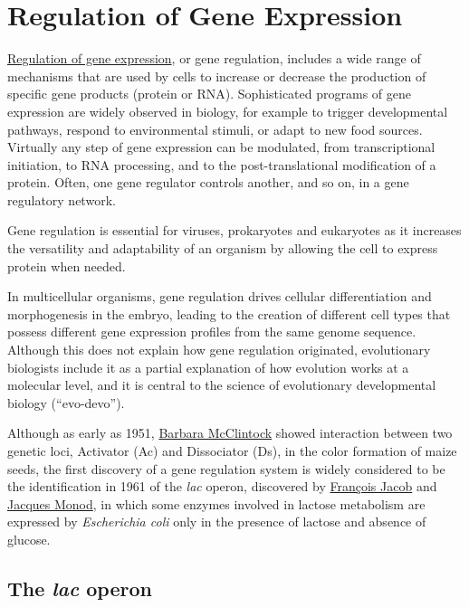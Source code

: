 \hypertarget{regulation-of-gene-expression}{%
\chapter{Regulation of Gene Expression}\label{regulation-of-gene-expression}}

\href{https://en.wikipedia.org/wiki/Regulation_of_gene_expression}{Regulation of gene expression}, or gene regulation, includes a wide range of mechanisms that are used by cells to increase or decrease the production of specific gene products (protein or RNA). Sophisticated programs of gene expression are widely observed in biology, for example to trigger developmental pathways, respond to environmental stimuli, or adapt to new food sources. Virtually any step of gene expression can be modulated, from transcriptional initiation, to RNA processing, and to the post-translational modification of a protein. Often, one gene regulator controls another, and so on, in a gene regulatory network.

Gene regulation is essential for viruses, prokaryotes and eukaryotes as it increases the versatility and adaptability of an organism by allowing the cell to express protein when needed.

In multicellular organisms, gene regulation drives cellular differentiation and morphogenesis in the embryo, leading to the creation of different cell types that possess different gene expression profiles from the same genome sequence. Although this does not explain how gene regulation originated, evolutionary biologists include it as a partial explanation of how evolution works at a molecular level, and it is central to the science of evolutionary developmental biology (``evo-devo'').

Although as early as 1951, \href{https://en.wikipedia.org/wiki/Barbara_McClintock}{Barbara McClintock} showed interaction between two genetic loci, Activator (Ac) and Dissociator (Ds), in the color formation of maize seeds, the first discovery of a gene regulation system is widely considered to be the identification in 1961 of the \emph{lac} operon, discovered by \href{https://en.wikipedia.org/wiki/Fran\%C3\%A7ois_Jacob}{François Jacob} and \href{https://en.wikipedia.org/wiki/Jacques_Monod}{Jacques Monod}, in which some enzymes involved in lactose metabolism are expressed by \emph{Escherichia coli} only in the presence of lactose and absence of glucose.

\hypertarget{the-lac-operon}{%
\section{\texorpdfstring{The \emph{lac} operon}{The lac operon}}\label{the-lac-operon}}

